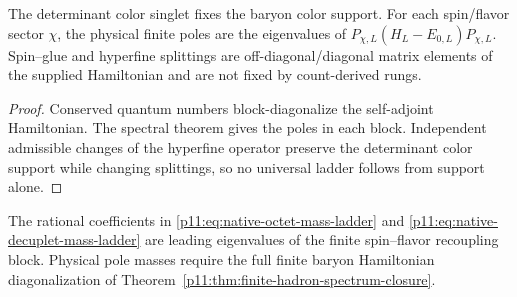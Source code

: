 \documentclass[12pt,a4paper]{article}
\begin{document}
\begin{theorem}
\label{p11:thm:native-baryon-spin-gluon-ladder}

The determinant color singlet fixes the baryon color support.  For each spin/flavor sector \(\chi\), the physical finite poles are the eigenvalues of \(P_{\chi,L}(H_L-E_{0,L})P_{\chi,L}\).  Spin--glue and hyperfine splittings are off-diagonal/diagonal matrix elements of the supplied Hamiltonian and are not fixed by count-derived rungs.
\label{p11:eq:baryon-determinant-spin-glue-components}
\label{p11:eq:native-baryon-anchor}
\label{p11:eq:native-delta-anchor}
\label{p11:eq:octet-strange-recoupling-operator}
\label{p11:eq:octet-strange-recoupling-projectors}
\label{p11:eq:octet-strange-recoupling-eigenvalues}
\label{p11:eq:native-octet-mass-ladder}
\label{p11:eq:decuplet-strange-recoupling-operator}
\label{p11:eq:native-decuplet-mass-ladder}
\label{p11:eq:native-baryon-ladder-numeric}
\label{p11:eq:native-baryon-isospin-splittings}
\end{theorem}
\begin{proof}

Conserved quantum numbers block-diagonalize the self-adjoint Hamiltonian.  The spectral theorem gives the poles in each block.  Independent admissible changes of the hyperfine operator preserve the determinant color support while changing splittings, so no universal ladder follows from support alone.
\end{proof}

\begin{remark}
\label{p11:rem:baryon-recoupling-status}
The rational coefficients in \eqref{p11:eq:native-octet-mass-ladder} and \eqref{p11:eq:native-decuplet-mass-ladder} are leading eigenvalues of the finite spin--flavor recoupling block.  Physical pole masses require the full finite baryon Hamiltonian diagonalization of Theorem~\ref{p11:thm:finite-hadron-spectrum-closure}.
\end{remark}
\end{document}
